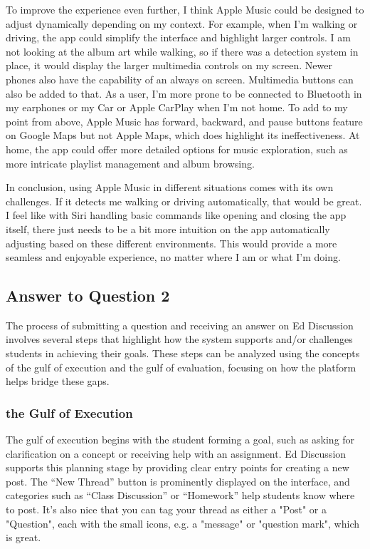 \documentclass[
	letterpaper, %
]{jdf}
\begin{document}
To improve the experience even further, I think Apple Music could be designed to adjust dynamically depending on my context. For example, when I’m walking or driving, the app could simplify the interface and highlight larger controls. I am not looking at the album art while walking, so if there was a detection system in place, it would display the larger multimedia controls on my screen. Newer phones also have the capability of an always on screen. Multimedia buttons can also be added to that. As a user, I'm more prone to be connected to Bluetooth in my earphones or my Car or Apple CarPlay when I'm not home. To add to my point from above, Apple Music has forward, backward, and pause buttons feature on Google Maps but not Apple Maps, which does highlight its ineffectiveness. At home, the app could offer more detailed options for music exploration, such as more intricate playlist management and album browsing. 

In conclusion, using Apple Music in different situations comes with its own challenges. If it detects me walking or driving automatically, that would be great. I feel like with Siri handling basic commands like opening and closing the app itself, there just needs to be a bit more intuition on the app automatically adjusting based on these different environments. This would provide a more seamless and enjoyable experience, no matter where I am or what I’m doing. 
\newpage

\subsection{Answer to Question 2}
The process of submitting a question and receiving an answer on Ed Discussion involves several steps that highlight how the system supports and/or challenges students in achieving their goals. These steps can be analyzed using the concepts of the gulf of execution and the gulf of evaluation, focusing on how the platform helps bridge these gaps.

\subsubsection {the Gulf of Execution}
The gulf of execution begins with the student forming a goal, such as asking for clarification on a concept or receiving help with an assignment. Ed Discussion supports this planning stage by providing clear entry points for creating a new post. The “New Thread” button is prominently displayed on the interface, and categories such as “Class Discussion” or “Homework” help students know where to post. It’s also nice that you can tag your thread as either a "Post" or a "Question", each with the small icons, e.g. a "message" or "question mark", which is great. 
\end{document}
